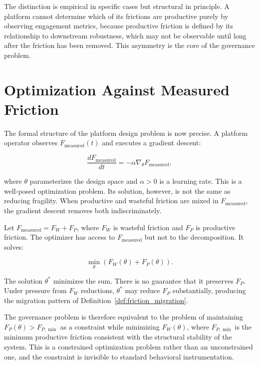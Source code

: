 \documentclass[11pt]{article}
\theoremstyle{remark}
\begin{document}
The distinction is empirical in specific cases but structural in principle. A platform cannot determine which of its frictions are productive purely by observing engagement metrics, because productive friction is defined by its relationship to downstream robustness, which may not be observable until long after the friction has been removed. This asymmetry is the core of the governance problem.

\section{Optimization Against Measured Friction}
\label{sec:optimization_friction}

The formal structure of the platform design problem is now precise. A platform operator observes $F_{\text{measured}}(t)$ and executes a gradient descent:

\[
\frac{d F_{\text{measured}}}{dt} = -\alpha \nabla_{\theta} F_{\text{measured}},
\]

where $\theta$ parameterizes the design space and $\alpha > 0$ is a learning rate. This is a well-posed optimization problem. Its solution, however, is not the same as reducing fragility. When productive and wasteful friction are mixed in $F_{\text{measured}}$, the gradient descent removes both indiscriminately.

Let $F_{\text{measured}} = F_W + F_P$, where $F_W$ is wasteful friction and $F_P$ is productive friction. The optimizer has access to $F_{\text{measured}}$ but not to the decomposition. It solves:

\[
\min_\theta \left( F_W(\theta) + F_P(\theta) \right).
\]

The solution $\theta^*$ minimizes the sum. There is no guarantee that it preserves $F_P$. Under pressure from $F_W$ reductions, $\theta^*$ may reduce $F_P$ substantially, producing the migration pattern of Definition~\ref{def:friction_migration}.

The governance problem is therefore equivalent to the problem of maintaining $F_P(\theta) > F_{P,\min}$ as a constraint while minimizing $F_W(\theta)$, where $F_{P,\min}$ is the minimum productive friction consistent with the structural stability of the system. This is a constrained optimization problem rather than an unconstrained one, and the constraint is invisible to standard behavioral instrumentation.
\end{document}
